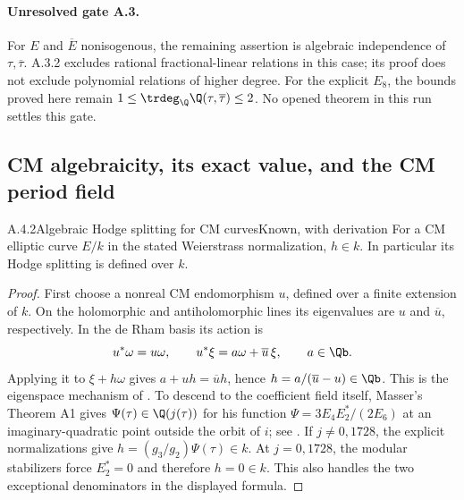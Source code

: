 \paragraph{Unresolved gate A.3.}
For $E$ and $\overline E$ nonisogenous, the remaining assertion is algebraic independence of $\tau,\overline\tau$. A.3.2 excludes rational fractional-linear relations in this case; its proof does not exclude polynomial relations of higher degree. For the explicit $E_8$, the bounds proved here remain
$1\le\trdeg_{\Q}\Q(\tau,\overline\tau)\le2$. No opened theorem in this run settles this gate.

\subsection{CM algebraicity, its exact value, and the CM period field}

\begin{result}{A.4.2}{Algebraic Hodge splitting for CM curves}{Known, with derivation}
For a CM elliptic curve $E/k$ in the stated Weierstrass normalization, $h\in k$. In particular its Hodge splitting is defined over $k$.
\end{result}
\begin{proof}
First choose a nonreal CM endomorphism $u$, defined over a finite extension of $k$. On the holomorphic and antiholomorphic lines its eigenvalues are $u$ and $\overline u$, respectively. In the de Rham basis its action is
\[
 u^*\omega=u\omega,\qquad u^*\xi=a\omega+\overline u\,\xi,
 \qquad a\in\Qb.
\]
Applying it to $\xi+h\omega$ gives $a+uh=\overline u h$, hence $h=a/(\overline u-u)\in\Qb$. This is the eigenspace mechanism of \cite[Lemma 4.0.7, p.501]{EllKatz1976}. To descend to the coefficient field itself, Masser's Theorem A1 gives $\Psi(\tau)\in\Q(j(\tau))$ for his function
$\Psi=3E_4E_2^*/(2E_6)$ at an imaginary-quadratic point outside the orbit of $i$; see \cite[Appendix One, Theorem A1 and (100), p.114]{EllMasser1975}. If $j\ne0,1728$, the explicit normalizations give $h=(g_3/g_2)\Psi(\tau)\in k$. At $j=0,1728$, the modular stabilizers force $E_2^*=0$ and therefore $h=0\in k$. This also handles the two exceptional denominators in the displayed formula.
\end{proof}

